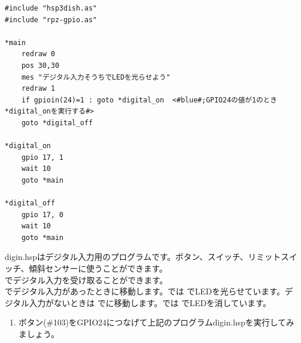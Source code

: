 \begin{lstlisting}[caption=digout.hsp,label=digout.hsp]
#include "hsp3dish.as"
#include "rpz-gpio.as"

*main
	redraw 0
	pos 30,30
	mes "デジタル入力そうちでLEDを光らせよう"
	redraw 1
	if gpioin(24)=1 : goto *digital_on	<#blue#;GPIO24の値が1のとき*digital_onを実行する#>
	goto *digital_off
        
*digital_on
	gpio 17, 1
	wait 10
	goto *main

*digital_off
	gpio 17, 0
	wait 10
	goto *main
\end{lstlisting}

digin.hspはデジタル入力用のプログラムです。ボタン、スイッチ、リミットスイッチ、傾斜センサーに使うことができます。\\

でデジタル入力を受け取ることができます。\\

でデジタル入力があったときに移動します。では でLEDを光らせています。デジタル入力がないときは でに移動します。では でLEDを消しています。

\begin{tcolorbox}[title=\useOmetoi]
\begin{enumerate}
\item ボタン(\#103)をGPIO24につなげて上記のプログラムdigin.hspを実行してみましょう。
\end{enumerate}
\end{tcolorbox}
\begin{tcolorbox}[title=\useOmetoi]
\begin{enumerate}
\end{enumerate}
\end{tcolorbox}
\begin{tcolorbox}[title=\useOmetoi]
\begin{enumerate}
\end{enumerate}
\end{tcolorbox}
\begin{tcolorbox}[title=\useOmetoi]
\begin{enumerate}
\end{enumerate}
\end{tcolorbox}
\begin{tcolorbox}[title=\useOmetoi]
\begin{enumerate}
\end{enumerate}
\end{tcolorbox}

